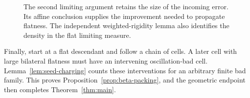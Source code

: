 \begin{figure}[ht]
\centering
{}
\caption{The second limiting argument retains the size of the incoming
error. Its affine conclusion supplies the improvement needed to
propagate flatness. The independent weighted-rigidity lemma also
identifies the density in the flat limiting measure.}\label{fig:two-limits}
\end{figure}

Finally, start at a flat descendant and follow a chain of cells.
A later cell with large bilateral flatness must have an intervening
oscillation-bad cell. Lemma~\ref{lem:seed-charging} counts these
interventions for an arbitrary finite bad family. This proves
Proposition~\ref{prop:beta-packing}, and the geometric endpoint then
completes Theorem~\ref{thm:main}.
